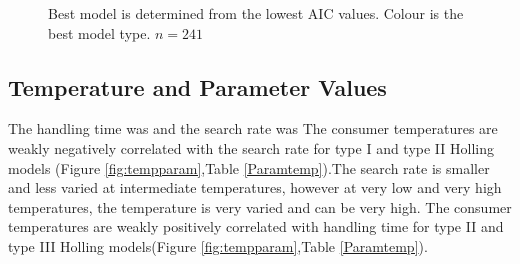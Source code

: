 \documentclass{article}
\begin{document}
\begin{figure}[ht!]
\caption{Best model is determined from the lowest AIC values.  Colour is the best model type. $n=241$}
\label{fig:tempholandmodel}
\end{figure}

\subsection{Temperature and Parameter Values}
The handling time was and the search rate was
The consumer temperatures are  weakly negatively correlated with the search rate for type I and type II Holling models (Figure \ref{fig:tempparam},Table \ref{Paramtemp}).The search rate is smaller and less varied at intermediate temperatures, however at very low and very high temperatures, the temperature is very varied and can be very high. The consumer temperatures are weakly positively correlated with handling time for type II and type III Holling models(Figure \ref{fig:tempparam},Table \ref{Paramtemp}).

\end{document}
